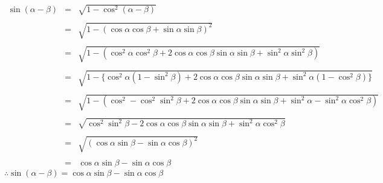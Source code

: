\documentclass[11pt]{article}
\begin{document}
$
\begin{array}{rcl}
\sin(\alpha-\beta) & = & \sqrt{1-\cos^2(\alpha-\beta)} \\
\\
& = & \sqrt{1-(\cos\alpha\cos\beta+\sin\alpha\sin\beta)^2} \\
\\
& = & \sqrt{1-(\cos^2\alpha\cos^2\beta+2\cos\alpha\cos\beta\sin\alpha\sin\beta+\sin^2\alpha\sin^2\beta)} \\
\\
& = & \sqrt{1-\{\cos^2\alpha(1-\sin^2\beta)+2\cos\alpha\cos\beta\sin\alpha\sin\beta+\sin^2\alpha(1-\cos^2\beta)\}} \\
\\
& = & \sqrt{1-(\cos^2-\cos^2\sin^2\beta+2\cos\alpha\cos\beta\sin\alpha\sin\beta+\sin^2\alpha-\sin^2\alpha\cos^2\beta)} \\
\\
& = & \sqrt{\cos^2\sin^2\beta-2\cos\alpha\cos\beta\sin\alpha\sin\beta+\sin^2\alpha\cos^2\beta} \\
\\
& = & \sqrt{(\cos\alpha\sin\beta-\sin\alpha\cos\beta)^2} \\
\\
& = & \cos\alpha\sin\beta-\sin\alpha\cos\beta
\end{array}
$
\\

$
\therefore \sin(\alpha-\beta) = \cos\alpha\sin\beta-\sin\alpha\cos\beta
$
\end{document}
